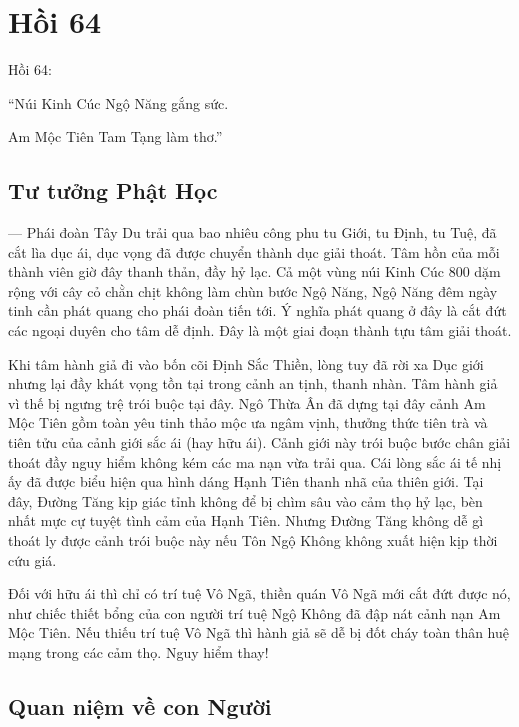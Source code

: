 \chapter{Hồi 64} %
\label{cha:hoi_64}

Hồi 64:

\begin{itshape}
``Núi Kinh Cúc Ngộ Năng gắng sức.

Am Mộc Tiên Tam Tạng làm thơ.''
\end{itshape}

\section{Tư tưởng Phật Học} %
\label{sec:64_phat_hoc}

— Phái đoàn Tây Du trải qua bao nhiêu công phu tu Giới, tu Định, tu Tuệ, đã cắt lìa dục ái, dục vọng đã được chuyển thành dục giải thoát. Tâm hồn của mỗi thành viên giờ đây thanh thản, đầy hỷ lạc. Cả một vùng núi Kinh Cúc 800 dặm rộng với cây cỏ chằn chịt không làm chùn bước Ngộ Năng, Ngộ Năng đêm ngày tinh cần phát quang cho phái đoàn tiến tới. Ý nghĩa phát quang ở đây là cắt đứt các ngoại duyên cho tâm dễ định. Đây là một giai đoạn thành tựu tâm giải thoát.

Khi tâm hành giả đi vào bốn cõi Định Sắc Thiền, lòng tuy đã rời xa Dục giới nhưng lại đầy khát vọng tồn tại trong cảnh an tịnh, thanh nhàn. Tâm hành giả vì thế bị ngưng trệ trói buộc tại đây. Ngô Thừa Ân đã dựng tại đây cảnh Am Mộc Tiên gồm toàn yêu tinh thảo mộc ưa ngâm vịnh, thưởng thức tiên trà và tiên tửu của cảnh giới sắc ái (hay hữu ái). Cảnh giới này trói buộc bước chân giải thoát đầy nguy hiểm không kém các ma nạn vừa trải qua. Cái lòng sắc ái tế nhị ấy đã được biểu hiện qua hình dáng Hạnh Tiên thanh nhã của thiên giới. Tại đây, Đường Tăng kịp giác tỉnh không để bị chìm sâu vào cảm thọ hỷ lạc, bèn nhất mực cự tuyệt tình cảm của Hạnh Tiên. Nhưng Đường Tăng không dễ gì thoát ly được cảnh trói buộc này nếu Tôn Ngộ Không không xuất hiện kịp thời cứu giá.

Đối với hữu ái thì chỉ có trí tuệ Vô Ngã, thiền quán Vô Ngã mới cắt đứt được nó, như chiếc thiết bổng của con người trí tuệ Ngộ Không đã đập nát cảnh nạn Am Mộc Tiên. Nếu thiếu trí tuệ Vô Ngã thì hành giả sẽ dễ bị đốt cháy toàn thân huệ mạng trong các cảm thọ. Nguy hiểm thay!

\section{Quan niệm về con Người} %
\label{sec:64_con_nguoi}

